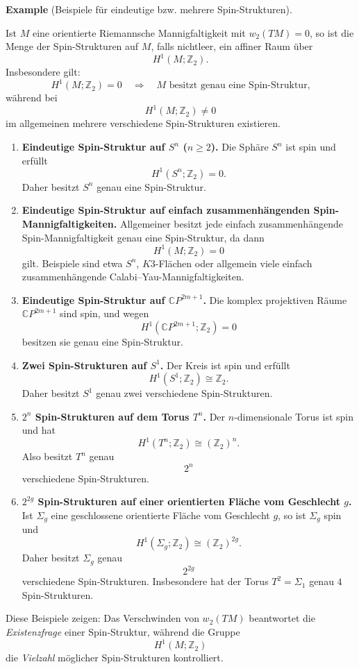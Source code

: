 \documentclass[10pt, letterpaper]{article}
\newcommand{\Z}{\mathbb{Z}}
\newcommand{\CP}{\mathbb{C}P}
\newcommand{\CustomHeading}[3]{%
  \par\medskip\noindent%
  \textbf{#1 #2} \textnormal{(#3)}.\enskip%
}
\newenvironment{EXA}[2]{\CustomHeading{Example}{#1}{#2}}{}
\begin{document}
\begin{EXA}{}{Beispiele für eindeutige bzw. mehrere Spin-Strukturen}
Ist \(M\) eine orientierte Riemannsche Mannigfaltigkeit mit \(w_2(TM)=0\), so ist die Menge der Spin-Strukturen auf \(M\), falls nichtleer, ein affiner Raum über
\[
H^1(M;\Z_2).
\]
Insbesondere gilt:
\[
H^1(M;\Z_2)=0
\quad\Longrightarrow\quad
\text{\(M\) besitzt genau eine Spin-Struktur,}
\]
während bei
\[
H^1(M;\Z_2)\neq 0
\]
im allgemeinen mehrere verschiedene Spin-Strukturen existieren.

\begin{enumerate}
    \item \textbf{Eindeutige Spin-Struktur auf \(S^n\) (\(n\ge 2\)).}  
    Die Sphäre \(S^n\) ist spin und erfüllt
    \[
    H^1(S^n;\Z_2)=0.
    \]
    Daher besitzt \(S^n\) genau eine Spin-Struktur.

    \item \textbf{Eindeutige Spin-Struktur auf einfach zusammenhängenden Spin-Mannigfaltigkeiten.}  
    Allgemeiner besitzt jede einfach zusammenhängende Spin-Mannigfaltigkeit genau eine Spin-Struktur, da dann
    \[
    H^1(M;\Z_2)=0
    \]
    gilt. Beispiele sind etwa \(S^n\), \(K3\)-Flächen oder allgemein viele einfach zusammenhängende Calabi--Yau-Mannigfaltigkeiten.

    \item \textbf{Eindeutige Spin-Struktur auf \(\CP^{2m+1}\).}  
    Die komplex projektiven Räume \(\CP^{2m+1}\) sind spin, und wegen
    \[
    H^1(\CP^{2m+1};\Z_2)=0
    \]
    besitzen sie genau eine Spin-Struktur.

    \item \textbf{Zwei Spin-Strukturen auf \(S^1\).}  
    Der Kreis ist spin und erfüllt
    \[
    H^1(S^1;\Z_2)\cong \Z_2.
    \]
    Daher besitzt \(S^1\) genau zwei verschiedene Spin-Strukturen.

    \item \textbf{\(2^n\) Spin-Strukturen auf dem Torus \(T^n\).}  
    Der \(n\)-dimensionale Torus ist spin und hat
    \[
    H^1(T^n;\Z_2)\cong (\Z_2)^n.
    \]
    Also besitzt \(T^n\) genau
    \[
    2^n
    \]
    verschiedene Spin-Strukturen.

    \item \textbf{\(2^{2g}\) Spin-Strukturen auf einer orientierten Fläche vom Geschlecht \(g\).}  
    Ist \(\Sigma_g\) eine geschlossene orientierte Fläche vom Geschlecht \(g\), so ist \(\Sigma_g\) spin und
    \[
    H^1(\Sigma_g;\Z_2)\cong (\Z_2)^{2g}.
    \]
    Daher besitzt \(\Sigma_g\) genau
    \[
    2^{2g}
    \]
    verschiedene Spin-Strukturen. Insbesondere hat der Torus \(T^2=\Sigma_1\) genau \(4\) Spin-Strukturen.

\end{enumerate}

Diese Beispiele zeigen: Das Verschwinden von \(w_2(TM)\) beantwortet die \emph{Existenzfrage} einer Spin-Struktur, während die Gruppe
\[
H^1(M;\Z_2)
\]
die \emph{Vielzahl} möglicher Spin-Strukturen kontrolliert.
\end{EXA}
\end{document}
